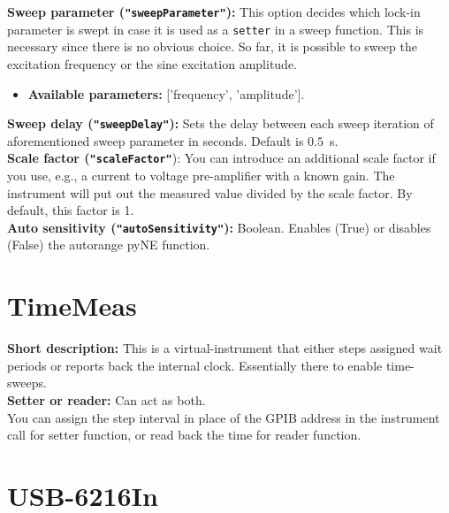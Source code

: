 \textbf{\textsf{Sweep parameter} (\texttt{"sweepParameter"}):} This option decides which lock-in parameter is swept in case it is used as a \texttt{setter} in a sweep function. This is necessary since there is no obvious choice. So far, it is possible to sweep the excitation frequency or the sine excitation amplitude.\\
\begin{itemize}[noitemsep]
\item \textbf{\textsf{Available parameters}: } ['frequency', 'amplitude'].
\end{itemize}
\textbf{\textsf{Sweep delay} (\texttt{"sweepDelay"}):} Sets the delay between each sweep iteration of aforementioned sweep parameter in seconds. Default is $0.5$~s.\\
\textbf{\textsf{Scale factor} (\texttt{"scaleFactor"}}): You can introduce an additional scale factor if you use, e.g., a current to voltage pre-amplifier with a known gain. The instrument will put out the measured value divided by the scale factor. By default, this factor is 1.\\
\textbf{\textsf{Auto sensitivity} (\texttt{"autoSensitivity"}):} Boolean. Enables (True) or disables (False) the autorange pyNE function.\\

\section{TimeMeas}

\textbf{\textsf{Short description}:} This is a virtual-instrument that either steps assigned wait periods or reports back the internal clock. Essentially there to enable time-sweeps.\\
\textbf{\textsf{Setter or reader}:} Can act as both.\\
You can assign the step interval in place of the GPIB address in the instrument call for setter function, or read back the time for reader function.\\

\section{USB-6216In}

